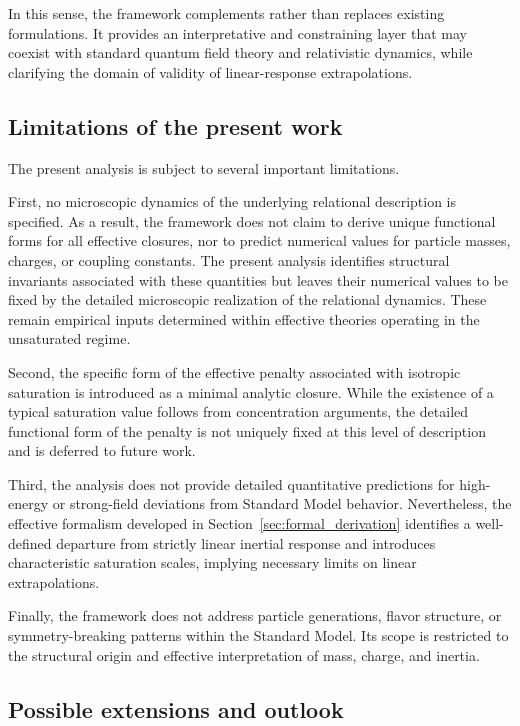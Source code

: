 \documentclass[pdflatex,sn-mathphys-num]{sn-jnl} %
\theoremstyle{remark}
\begin{document}
    In this sense, the framework complements rather than replaces existing
    formulations.
    It provides an interpretative and constraining layer that may coexist with
    standard quantum field theory and relativistic dynamics, while clarifying the
    domain of validity of linear-response extrapolations.

  \subsection{Limitations of the present work}
    \label{subsec:limitations}

    The present analysis is subject to several important limitations.

    First, no microscopic dynamics of the underlying relational description is
    specified.
    As a result, the framework does not claim to derive unique functional forms for
    all effective closures, nor to predict numerical values for particle masses, charges, or coupling constants.
    The present analysis identifies structural invariants associated with these
    quantities but leaves their numerical values to be fixed by the detailed
    microscopic realization of the relational dynamics.
    These remain empirical inputs determined within effective theories operating in
    the unsaturated regime.

    Second, the specific form of the effective penalty associated with isotropic
    saturation is introduced as a minimal analytic closure.
    While the existence of a typical saturation value follows from concentration
    arguments, the detailed functional form of the penalty is not uniquely fixed at
    this level of description and is deferred to future work.

    Third, the analysis does not provide detailed quantitative predictions for
    high-energy or strong-field deviations from Standard Model behavior.
    Nevertheless, the effective formalism developed in
    Section~\ref{sec:formal_derivation} identifies a well-defined departure from
    strictly linear inertial response and introduces characteristic saturation scales,
    implying necessary limits on linear extrapolations.

    Finally, the framework does not address particle generations, flavor structure,
    or symmetry-breaking patterns within the Standard Model.
    Its scope is restricted to the structural origin and effective interpretation of
    mass, charge, and inertia.

  \subsection{Possible extensions and outlook}
    \label{subsec:outlook}
\end{document}
